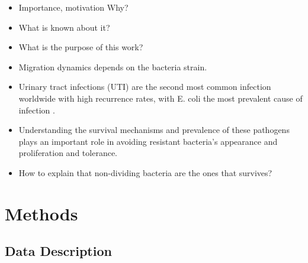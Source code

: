 \documentclass{article}
\begin{document}
\begin{itemize}
	\item Importance, motivation Why?
	\item What is known about it?
	\item What is the purpose of this work?
	\item Migration dynamics depends on the bacteria strain.
	\item Urinary tract infections (UTI) are the second most common infection worldwide with high recurrence rates, with E. coli the most prevalent cause of infection \cite{rosen2007detection}.
	\item Understanding the survival mechanisms and prevalence of these pathogens plays an important role in avoiding resistant bacteria's appearance and proliferation and tolerance.
	\item How to explain that non-dividing bacteria are the ones that survives?
\end{itemize}

\section{Methods}






\subsection{Data Description}




\end{document}
